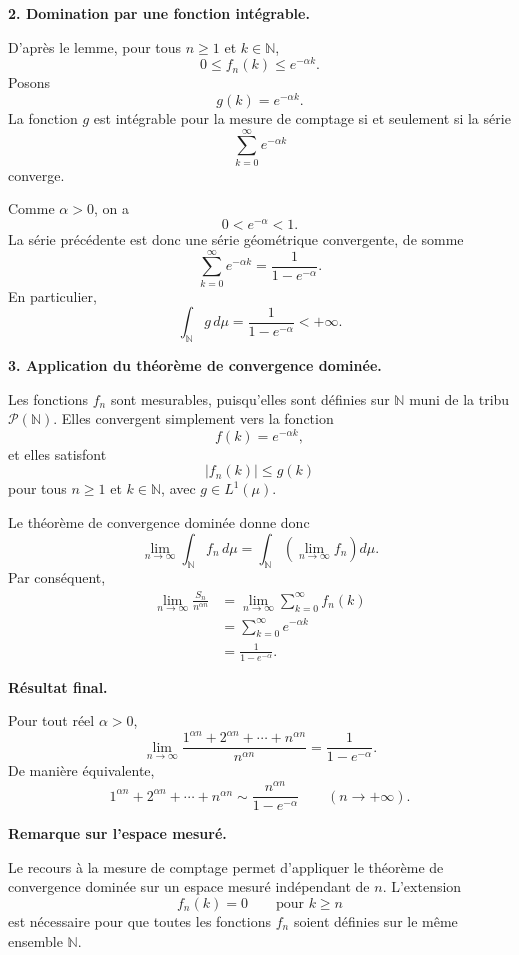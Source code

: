 \documentclass[11pt,a4paper]{article}
\newcommand{\N}{\mathbb{N}}
\newcommand{\1}{\mathbf{1}}
\begin{document}
\begin{preuvebox}
\medskip

\textbf{2. Domination par une fonction int\'egrable.}

D'apr\`es le lemme, pour tous \(n\geq1\) et \(k\in\N\),
\[
0\leq f_n(k)\leq e^{-\alpha k}.
\]
Posons
\[
g(k)=e^{-\alpha k}.
\]
La fonction \(g\) est int\'egrable pour la mesure de comptage si
et seulement si la s\'erie
\[
\sum_{k=0}^{\infty}e^{-\alpha k}
\]
converge.

Comme \(\alpha>0\), on a
\[
0<e^{-\alpha}<1.
\]
La s\'erie pr\'ec\'edente est donc une s\'erie g\'eom\'etrique
convergente, de somme
\[
\sum_{k=0}^{\infty}e^{-\alpha k}
=
\frac{1}{1-e^{-\alpha}}.
\]
En particulier,
\[
\int_{\N}g\,d\mu
=
\frac{1}{1-e^{-\alpha}}
<+\infty.
\]

\medskip

\textbf{3. Application du th\'eor\`eme de convergence domin\'ee.}

Les fonctions \(f_n\) sont mesurables, puisqu'elles sont
d\'efinies sur \(\N\) muni de la tribu \(\mathcal{P}(\N)\).
Elles convergent simplement vers la fonction
\[
f(k)=e^{-\alpha k},
\]
et elles satisfont
\[
|f_n(k)|\leq g(k)
\]
pour tous \(n\geq1\) et \(k\in\N\), avec \(g\in L^1(\mu)\).

Le th\'eor\`eme de convergence domin\'ee donne donc
\[
\lim_{n\to\infty}\int_{\N}f_n\,d\mu
=
\int_{\N}
\left(\lim_{n\to\infty}f_n\right)d\mu.
\]
Par cons\'equent,
\[
\begin{aligned}
\lim_{n\to\infty}\frac{S_n}{n^{\alpha n}}
&=
\lim_{n\to\infty}
\sum_{k=0}^{\infty}f_n(k)\\
&=
\sum_{k=0}^{\infty}e^{-\alpha k}\\
&=
\frac{1}{1-e^{-\alpha}}.
\end{aligned}
\]
\end{preuvebox}

\begin{resultatbox}
\textbf{R\'esultat final.}

Pour tout r\'eel \(\alpha>0\),
\[
\boxed{
\lim_{n\to\infty}
\frac{
  1^{\alpha n}+2^{\alpha n}+\cdots+n^{\alpha n}
}{
  n^{\alpha n}
}
=
\frac{1}{1-e^{-\alpha}}
}.
\]
De mani\`ere \'equivalente,
\[
\boxed{
1^{\alpha n}+2^{\alpha n}+\cdots+n^{\alpha n}
\sim
\frac{n^{\alpha n}}{1-e^{-\alpha}}
}
\qquad
(n\longrightarrow+\infty).
\]
\end{resultatbox}

\begin{remarquebox}
\textbf{Remarque sur l'espace mesur\'e.}

Le recours \`a la mesure de comptage permet d'appliquer le
th\'eor\`eme de convergence domin\'ee sur un espace mesur\'e
ind\'ependant de \(n\). L'extension
\[
f_n(k)=0
\qquad\text{pour } k\geq n
\]
est n\'ecessaire pour que toutes les fonctions \(f_n\) soient
d\'efinies sur le m\^eme ensemble \(\N\).
\end{remarquebox}
\end{document}
